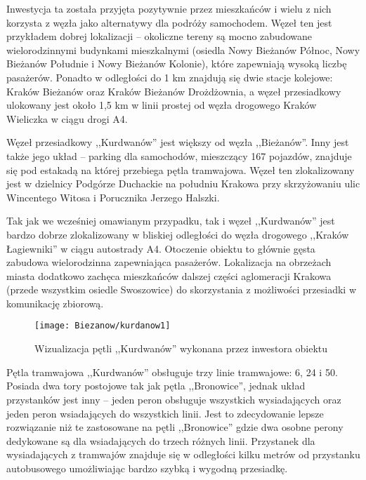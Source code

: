 \documentclass[twoside,12pt]{article}
\begin{document}
	Inwestycja ta została przyjęta pozytywnie przez mieszkańców i wielu z nich korzysta z węzła jako alternatywy dla podróży samochodem\cite{biezanow4}. Węzeł ten jest przykładem dobrej lokalizacji -- okoliczne tereny są mocno zabudowane wielorodzinnymi budynkami mieszkalnymi (osiedla Nowy Bieżanów Północ, Nowy Bieżanów Południe i Nowy Bieżanów Kolonie), które zapewniają wysoką liczbę pasażerów. Ponadto w odległości do 1 km znajdują się dwie stacje kolejowe: Kraków Bieżanów oraz Kraków Bieżanów Drożdżownia, a węzeł przesiadkowy ulokowany jest około 1,5 km w linii prostej od węzła drogowego Kraków Wieliczka w ciągu drogi A4. 
	
	Węzeł przesiadkowy ,,Kurdwanów'' jest większy od węzła ,,Bieżanów''. Inny jest także jego układ -- parking dla samochodów, mieszczący 167 pojazdów, znajduje się pod estakadą na której przebiega pętla tramwajowa. Węzeł ten zlokalizowany jest w dzielnicy Podgórze Duchackie na południu Krakowa przy skrzyżowaniu ulic Wincentego Witosa i Porucznika Jerzego Halszki. 
	
	Tak jak we wcześniej omawianym przypadku, tak i węzeł ,,Kurdwanów'' jest bardzo dobrze zlokalizowany w bliskiej odległości do węzła drogowego ,,Kraków Łagiewniki'' w ciągu autostrady A4. Otoczenie obiektu to głównie gęsta zabudowa wielorodzinna zapewniająca pasażerów. Lokalizacja na obrzeżach miasta dodatkowo zachęca mieszkańców dalszej części aglomeracji Krakowa (przede wszystkim osiedle Swoszowice) do skorzystania z możliwości przesiadki w komunikację zbiorową.
	
	\begin{figure}[H]
		\centering
		\texttt{[image: Biezanow/kurdanow1]}\\
		\caption{Wizualizacja pętli ,,Kurdwanów'' wykonana przez inwestora obiektu}
		\label{kurdanow1}
	\end{figure}	
	
	Pętla tramwajowa ,,Kurdwanów'' obsługuje trzy linie tramwajowe: 6, 24 i 50. Posiada dwa tory postojowe tak jak pętla ,,Bronowice'', jednak układ przystanków jest inny -- jeden peron obsługuje wszystkich wysiadających oraz jeden peron wsiadających do wszystkich linii. Jest to zdecydowanie lepsze rozwiązanie niż te zastosowane na pętli ,,Bronowice'' gdzie dwa osobne perony dedykowane są dla wsiadających do trzech różnych linii. Przystanek dla wysiadających z tramwajów znajduje się w odległości kilku metrów od przystanku autobusowego umożliwiając bardzo szybką i wygodną przesiadkę.
	
\end{document}

